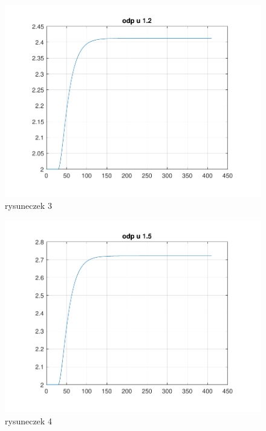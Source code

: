 \begin{figure}[H]
    \centering
    \includegraphics[scale=0.8]{../zad2/img/odp_u_1_2.pdf}
    \caption{rysuneczek 3}
\end{figure}
\begin{figure}[H]
    \centering
    \includegraphics[scale=0.8]{../zad2/img/odp_u_1_5.pdf}
    \caption{rysuneczek 4}
\end{figure}
